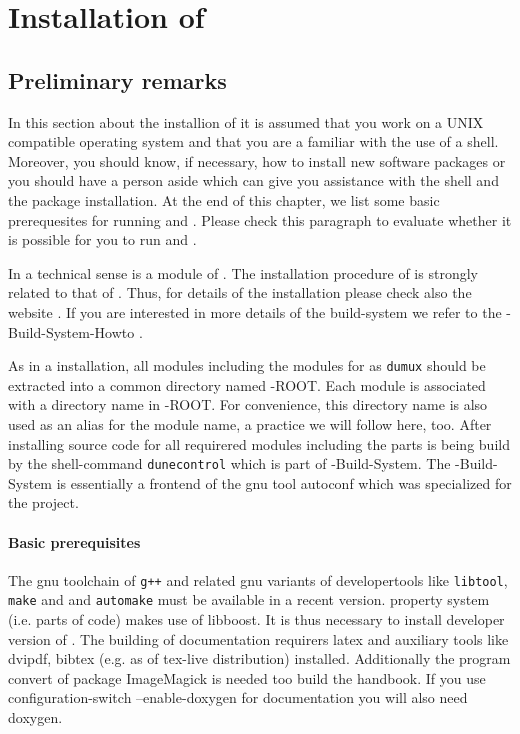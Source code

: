 \section{Installation of \Dumux} \label{install}
\subsection{Preliminary remarks}

In this section about the installion of \Dumux it is assumed that you work on a UNIX compatible operating system and that you are a familiar with the use of a shell. Moreover, you should know,  if necessary, how to install
new software packages or you should have a person aside which can give you assistance with the shell and
the package installation. At the end of this chapter, we list some basic prerequesites for running \Dune and \Dumux. Please check this paragraph to evaluate whether it is possible for you to run \Dune and \Dumux.

In a technical sense \Dumux is a module of \Dune. The installation procedure of \Dumux is strongly related to 
that of \Dune.  Thus, for details of the installation please check also the {\Dune} website \cite{DUNE-HP}. If you are interested in more details of the build-system we refer to the {\Dune}-Build-System-Howto \cite{DUNE-HP}.

As in a \Dune installation, all \Dune modules including the modules for \Dumux as \texttt{dumux} should be extracted into a common directory named {\Dune}-ROOT. Each \Dune module is associated with a directory name in {\Dune}-ROOT. For convenience, this directory name is  also used as an alias for the module name, a practice we will follow here, too.
After installing source code for all requirered \Dune modules including the \Dumux parts
\Dune is being build by the shell-command \texttt{dunecontrol} which is part of {\Dune}-Build-System. The {\Dune}-Build-System is essentially a frontend of the gnu tool autoconf which was specialized for the \Dune project.

\paragraph{Basic prerequisites} \label{prerequisites}
The gnu toolchain of \texttt{g++}  and related gnu variants of developertools like \texttt{libtool}, \texttt{make} and
and \texttt{automake} must be available in a recent version. \Dumux property system (i.e. parts of code) makes use of libboost. It is thus necessary
to install developer version of .
The building of documentation requirers latex and auxiliary tools like dvipdf, bibtex (e.g. as of tex-live distribution) installed. Additionally the program convert of package ImageMagick is needed too build the handbook.  If you use configuration-switch --enable-doxygen for documentation you will also need doxygen.

